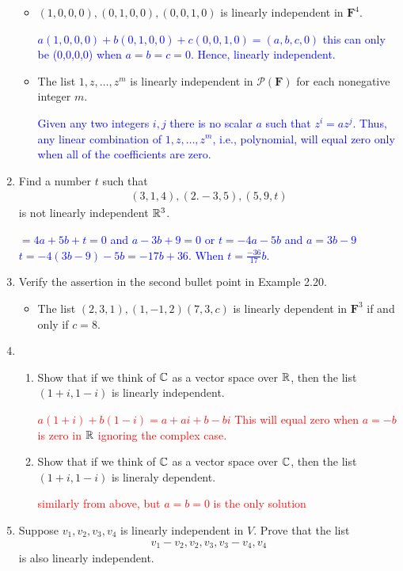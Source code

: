 \documentclass[10pt,a4paper]{report}
\newcommand{\RED}[1]{\textcolor{red}{#1}}
\newcommand{\BLUE}[1]{\textcolor{blue}{#1}}
\newcommand{\F}{\textbf{F}}
\begin{document}
\begin{enumerate}
\begin{itemize}
	\item $(1,0,0,0),(0,1,0,0),(0,0,1,0)$ is linearly independent in $\F^4$.
	
	\BLUE{$a(1,0,0,0)+b(0,1,0,0)+c(0,0,1,0)=(a,b,c,0)$  this can only be (0,0,0,0) when $a=b=c=0$.  Hence, linearly independent.
	}
	
	\item The list $1,z,\dots,z^m$ is linearly independent in $\mathcal{P}(\F)$ for each nonegative integer $m$.
	
	\BLUE{Given any two integers $i,j$ there is no scalar $a$ such that $z^i=az^j$.  Thus, any linear combination of $1,z,\dots,z^m$, i.e., polynomial, will equal zero only when all of the coefficients are zero.
	}
\end{itemize}

\item Find a number $t$ such that 
\begin{align*}
	(3,1,4), (2.-3,5), (5,9,t)
\end{align*}is not linearly independent $\mathbb{R}^3$.

	\BLUE{$=4a+5b+t=0$ and $a-3b+9=0$ or $t=-4a-5b$ and $a=3b-9$ $t=-4(3b-9)-5b=-17b+36$.  When $t = \frac{-36}{17}b$.
	}

\item Verify the assertion in the second bullet point in Example 2.20.
\begin{itemize}
	
	\item The list $(2,3,1),(1,-1,2)(7,3,c)$ is linearly dependent in $\F^3$ if and only if $c=8$.
	
\end{itemize}

\item \begin{enumerate}
	\item Show that if we think of $\mathbb{C}$ as a vector space over $\mathbb{R}$, then the list $(1+i, 1-i)$ is linearly independent.
	
	\RED{$a(1+i)+b(1-i)=a+ai+b-bi$  This will equal zero when $a=-b$ is zero in $\mathbb{R}$ ignoring the complex case.
	}	
	
	\item Show that if we think of $\mathbb{C} $ as a vector space over $\mathbb{C}$, then the list $(1+i, 1-i)$ is lineraly dependent.
	
	\RED{similarly from above, but $a=b=0$ is the only solution}
\end{enumerate}

\item Suppose $v_1,v_2, v_3,v_4$ is linearly independent in $V$. Prove that the list
\begin{align*}
	v_1-v_2, v_2, v_3, v_3 -v_4, v_4
\end{align*}is also linearly independent.


\end{enumerate}
\end{document}
